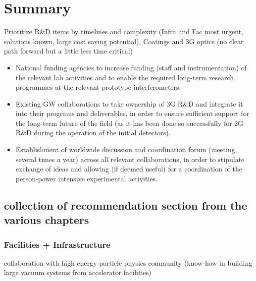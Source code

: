 \chapter{Summary}
\label{sec:Summary}

Prioritize R\&D items by timelines and complexity (Infra and Fac most urgent, solutions known, large cost saving potential), 
Coatings and 3G optics (no clear path forward but a little less time critical) 


\begin{itemize}
\item National funding agencies to increase funding (staff and instrumentation) of the relevant lab activities and to enable the required long-term research programmes at the relevant prototype interferometers.
\item Existing GW collaborations to take ownership of 3G R\&D and integrate it into their programs and deliverables, in order to ensure sufficient support for the long-term future of the field (as it has been done so successfully for 2G R\&D during the operation of the initial detectors). 
\item Establishment of worldwide discussion and coordination forum (meeting several times a year) across all relevant collaborations, in order to stipulate exchange of ideas and allowing (if deemed useful) for a coordination of the person-power intensive experimental activities.
\end{itemize}

\section{collection of recommendation section from the various chapters}
\subsection{Facilities + Infrastructure}
collaboration with high energy particle physics community (know-how in building large vacuum
systems from accelerator facilities)


